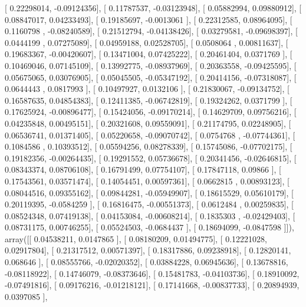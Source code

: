 \documentclass{article}
\begin{document}
       [ 0.22298014, -0.09124356],
       [ 0.11787537, -0.03123948],
       [ 0.05882994,  0.09880912],
       [ 0.08847017,  0.04233493],
       [ 0.19185697, -0.0013061 ],
       [ 0.22312585,  0.08964095],
       [ 0.1160798 , -0.08240589],
       [ 0.21512794, -0.04138426],
       [ 0.03279581, -0.09698397],
       [ 0.0444199 ,  0.07275089],
       [ 0.04959188,  0.02528705],
       [ 0.0508064 ,  0.00811637],
       [ 0.19683367, -0.00420607],
       [ 0.13471004,  0.07425222],
       [ 0.20461404,  0.0371769 ],
       [ 0.10469046,  0.07145109],
       [ 0.13992775, -0.08937969],
       [ 0.20363558, -0.09425595],
       [ 0.05675065,  0.03076905],
       [ 0.05045505, -0.05347192],
       [ 0.20414156, -0.07318087],
       [ 0.0644443 ,  0.0817993 ],
       [ 0.10497927,  0.0132106 ],
       [ 0.21830067, -0.09134752],
       [ 0.16587635,  0.04854383],
       [ 0.12411385, -0.06742819],
       [ 0.19324262,  0.0371799 ],
       [ 0.17625924, -0.00896477],
       [ 0.15424056, -0.09170214],
       [ 0.14629709,  0.09756216],
       [ 0.04235848,  0.00495151],
       [ 0.20321608,  0.09559091],
       [ 0.21174795,  0.02248905],
       [ 0.06536741,  0.01371405],
       [ 0.05220658, -0.09070742],
       [ 0.0754768 , -0.07744361],
       [ 0.1084586 ,  0.10393512],
       [ 0.05594256,  0.08278339],
       [ 0.15745086, -0.07702175],
       [ 0.19182356, -0.00264435],
       [ 0.19291552,  0.05736678],
       [ 0.20341456, -0.02646815],
       [ 0.08343374,  0.08706108],
       [ 0.16791499,  0.07754107],
       [ 0.17847118,  0.09866   ],
       [ 0.17543561,  0.03571474],
       [ 0.14054451,  0.00597361],
       [ 0.0662815 ,  0.00893123],
       [ 0.08044516,  0.09355162],
       [ 0.09844281, -0.05949907],
       [ 0.18615529,  0.05610179],
       [ 0.20119395, -0.0584259 ],
       [ 0.16816475, -0.00551373],
       [ 0.0612484 ,  0.00259835],
       [ 0.08524348,  0.07419138],
       [ 0.04153084, -0.00608214],
       [ 0.1835303 , -0.02429403],
       [ 0.08731175,  0.00746255],
       [ 0.05524503, -0.0684437 ],
       [ 0.18694099, -0.0847598 ]]), array([[ 0.04538211,  0.0147865 ],
       [ 0.08180209,  0.01494775],
       [ 0.12221028,  0.02917804],
       [ 0.21317512,  0.00571397],
       [ 0.18317886,  0.09238918],
       [ 0.12820141,  0.068646  ],
       [ 0.08555766, -0.02020352],
       [ 0.03884228,  0.06945636],
       [ 0.13678816, -0.08118922],
       [ 0.14746079, -0.08373646],
       [ 0.15481783, -0.04103736],
       [ 0.18910092, -0.07491816],
       [ 0.09176216, -0.01218121],
       [ 0.17141668, -0.00837733],
       [ 0.20894939,  0.0397085 ],
\end{document}
